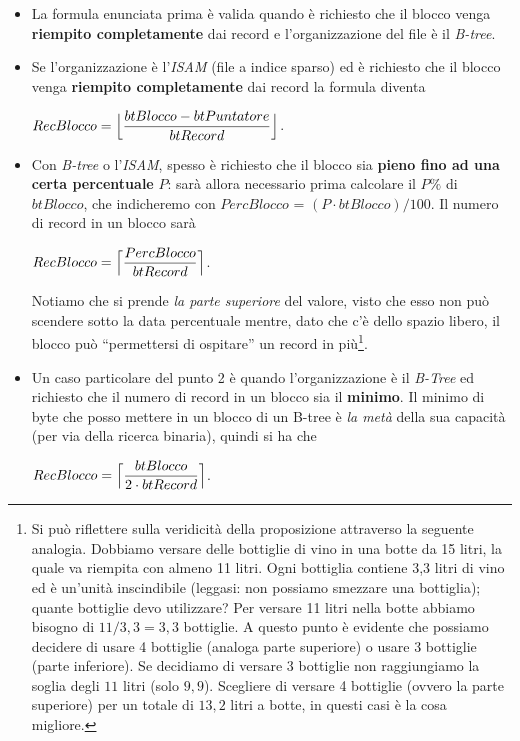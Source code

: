  \begin{itemize}
  \item La formula enunciata prima è valida quando è richiesto che il blocco venga \textbf{riempito completamente} dai record e 
 l'organizzazione del file è il \emph{B-tree}.
 \item Se l'organizzazione è l'\emph{ISAM} (file a indice sparso) ed è richiesto che il blocco venga \textbf{riempito completamente} 
 dai record la formula diventa
  \begin{center}
  $RecBlocco = \Bigl\lfloor \dfrac{btBlocco - btPuntatore}{btRecord} \Bigr\rfloor$.
  \end{center}
  \item Con \emph{B-tree} o l'\emph{ISAM}, spesso è richiesto che il blocco sia \textbf{pieno fino ad una certa percentuale} $P$:
  sarà allora necessario prima calcolare il $P\%$ di $btBlocco$, che indicheremo con $PercBlocco$ = $(P \cdot btBlocco)/100$. Il numero
  di record in un blocco sarà
  \begin{center}
  $RecBlocco = \Bigl\lceil \dfrac{PercBlocco}{btRecord} \Bigr\rceil$.
  \end{center}
  Notiamo che si prende \emph{la parte superiore} del valore, visto che esso non può scendere sotto la data percentuale mentre, 
   dato che c'è dello spazio libero, il blocco può ``permettersi di ospitare'' un record in più\footnote{Si può riflettere sulla
  veridicità della proposizione attraverso la seguente analogia.
  Dobbiamo versare delle bottiglie di vino in una botte da 15 litri, la quale va riempita con almeno 11 litri. 
  Ogni bottiglia contiene 3,3 litri di vino ed è un'unità inscindibile (leggasi: non possiamo smezzare una bottiglia); quante bottiglie
  devo utilizzare? Per versare 11 litri nella botte abbiamo bisogno di $11/3,3=3,3$ bottiglie. A questo punto è evidente che 
  possiamo decidere di usare 4 bottiglie (analoga parte superiore) o usare 3 bottiglie (parte inferiore). Se decidiamo di versare 
  3 bottiglie non raggiungiamo la soglia degli $11$ litri (solo $9,9$). Scegliere di versare 4 bottiglie (ovvero 
  la parte superiore) per un totale di $13,2$ litri a botte, in questi casi è la cosa migliore.}.  
  \item Un caso particolare del punto 2 è quando l'organizzazione è il \emph{B-Tree} ed richiesto che il numero di record in un blocco
  sia il \textbf{minimo}. Il minimo di byte che posso mettere in un blocco di un B-tree è \emph{la metà} della sua capacità
  (per via della ricerca binaria), quindi si ha che
   \begin{center}
  $RecBlocco = \Bigl\lceil \dfrac{btBlocco}{2\cdot btRecord} \Bigr\rceil$.\\
  \end{center}
 \end{itemize}
 
